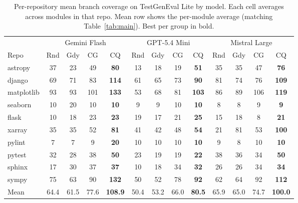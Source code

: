 \begin{table}[t]
\centering
\caption{Per-repository mean branch coverage on TestGenEval Lite by model. Each cell averages across modules in that repo. Mean row shows the per-module average (matching Table~\ref{tab:main}). Best per group in bold.}
\label{tab:perrepo_testgeneval}
\small
\setlength{\tabcolsep}{3pt}
\begin{tabular}{l cccc cccc cccc}
\toprule
& \multicolumn{4}{c}{Gemini Flash}& \multicolumn{4}{c}{GPT-5.4 Mini}& \multicolumn{4}{c}{Mistral Large} \\
\cmidrule(lr){2-5} \cmidrule(lr){6-9} \cmidrule(lr){10-13}
Repo & Rnd & Gdy & CG & CQ & Rnd & Gdy & CG & CQ & Rnd & Gdy & CG & CQ \\
\midrule
astropy & 37 & 23 & 49 & \textbf{80} & 13 & 18 & 19 & \textbf{51} & 35 & 35 & 47 & \textbf{76} \\
django & 69 & 71 & 83 & \textbf{114} & 61 & 65 & 73 & \textbf{90} & 81 & 74 & 76 & \textbf{109} \\
matplotlib & 93 & 93 & 101 & \textbf{133} & 53 & 68 & 81 & \textbf{103} & 86 & 89 & 106 & \textbf{119} \\
seaborn & 10 & 20 & 10 & \textbf{10} & 9 & 9 & 10 & \textbf{10} & 8 & 8 & 9 & \textbf{9} \\
flask & 10 & 18 & 23 & \textbf{23} & 19 & 17 & 21 & \textbf{25} & 15 & 18 & 8 & \textbf{21} \\
xarray & 35 & 35 & 52 & \textbf{81} & 41 & 42 & 48 & \textbf{54} & 21 & 81 & 53 & \textbf{100} \\
pylint & 7 & 7 & 9 & \textbf{20} & 10 & 10 & 10 & \textbf{10} & 9 & 8 & 10 & \textbf{10} \\
pytest & 32 & 28 & 38 & \textbf{50} & 23 & 19 & 19 & \textbf{22} & 38 & 36 & 34 & \textbf{50} \\
sphinx & 17 & 30 & 37 & \textbf{37} & 10 & 18 & 34 & \textbf{32} & 26 & 26 & 34 & \textbf{34} \\
sympy & 75 & 63 & 90 & \textbf{132} & 50 & 52 & 78 & \textbf{92} & 62 & 64 & 92 & \textbf{112} \\
\midrule
Mean & 64.4 & 61.5 & 77.6 & \textbf{108.9} & 50.4 & 53.2 & 66.0 & \textbf{80.5} & 65.9 & 65.0 & 74.7 & \textbf{100.0} \\
\bottomrule
\end{tabular}
\end{table}